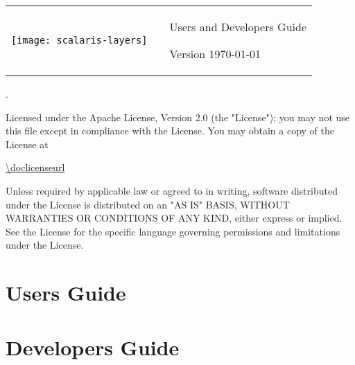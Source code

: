 \documentclass[a4paper]{scrreprt}
\begin{document}
\vspace*{4cm}
\thispagestyle{empty}
\setlength{\parskip}{1ex}
\begin{tabular}{p{4cm}p{0.5cm}p{10cm}}
\parbox{4cm}{\texttt{[image: scalaris-layers]}}
& &\sffamily\bfseries\Huge
  \bigskip {\textcolor{rltblue}{\scalaris{}:}}

\medskip
 \mdseries Users and Developers Guide

\bigskip\medskip
\LARGE Version \docversion{} \hfill \today\\
\end{tabular}
\vfill
{\scriptsize
\doccopyright{}.

Licensed under the Apache License, Version 2.0 (the "License");
you may not use this file except in compliance with the License.
You may obtain a copy of the License at

\url{\doclicenseurl}

Unless required by applicable law or agreed to in writing, software
distributed under the License is distributed on an "AS IS" BASIS,
WITHOUT WARRANTIES OR CONDITIONS OF ANY KIND, either express or implied.
See the License for the specific language governing permissions and
limitations under the License.
}

\tableofcontents

\part{Users Guide}













\part{Developers Guide}












\end{document}
